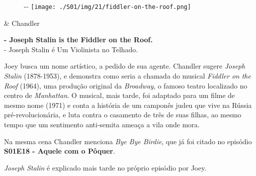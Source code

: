 \begin{figure}[!ht]
  \begin{adjustwidth}{-\oddsidemargin-1in}{-\rightmargin}
    \centering
    \texttt{[image: ./S01/img/21/fiddler-on-the-roof.png]}
  \end{adjustwidth}
\end{figure}

\begin{tcolorbox}[enhanced,center upper,
    drop fuzzy shadow southeast, boxrule=0.3pt,
    lower separated=false, breakable,
    colframe=black!30!dialogoBorder,colback=white]
\begin{minipage}[c]{0.16\linewidth}
   & \centering \scriptsize{Chandler}
\end{minipage}
\hfill
\begin{minipage}[c]{0.8\linewidth}
  \textbf{- Joseph Stalin is the Fiddler on the Roof.}\\
  - Joseph Stalin é Um Violinista no Telhado.
\end{minipage}
\end{tcolorbox}

Joey busca um nome artístico, a pedido de sua agente. Chandler sugere
\emph{Joseph Stalin} (1878-1953), e demonstra como seria a chamada do
musical \emph{Fiddler on the Roof} (1964), uma produção original da
\emph{Broadway}, o famoso teatro localizado no centro de
\emph{Manhattan}. O musical, mais tarde, foi adaptado para um filme de
mesmo nome (1971) e conta a história de um camponês judeu que vive na
Rússia pré-revolucionária, e luta contra o casamento de três de suas
filhas, ao mesmo tempo que um sentimento anti-semita ameaça a vila onde
mora.

Na mesma cena Chandler menciona \emph{Bye Bye Birdie}, que já foi citado
no episódio
\textbf{\textcolor{primarycolor}{S01E18 - Aquele com o Pôquer}}.

\emph{Joseph Stalin} é explicado mais tarde no próprio episódio por
Joey.

